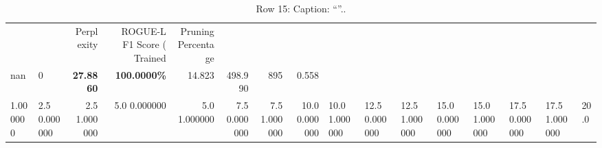 \begin{table}
\caption{Row 15\ifshowcaption{}: Caption: ``''.\else.\fi}
\label{tab:evaluation-pipeline-15}
\begin{tabular}{llrrrrrr}
 &  & Perplexity & ROGUE-L F1 Score (%
Trained & Pruning Percentage &  &  &  &  &  &  \\
nan & 0 & \bfseries 27.8860 & \bfseries 100.0000\% & 14.823 & 498.990 & 895 & 0.558 \\
1.000000 & 2.5%
0.000000 & 2.5%
1.000000 & 5.0%
0.000000 & 5.0%
1.000000 & 7.5%
0.000000 & 7.5%
1.000000 & 10.0%
0.000000 & 10.0%
1.000000 & 12.5%
0.000000 & 12.5%
1.000000 & 15.0%
0.000000 & 15.0%
1.000000 & 17.5%
0.000000 & 17.5%
1.000000 & 20.0%

\end{tabular}
\end{table}
